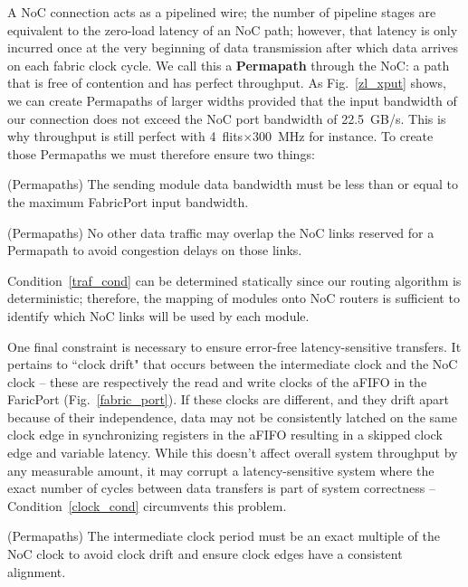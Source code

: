 A NoC connection acts as a pipelined wire; the number of pipeline stages are equivalent to the zero-load latency of an NoC path; however, that latency is only incurred once at the very beginning of data transmission after which data arrives on each fabric clock cycle.
We call this a \textbf{Permapath} through the NoC: a path that is free of contention and has perfect throughput.
As Fig.~\ref{zl_xput} shows, we can create Permapaths of larger widths provided that the input bandwidth of our connection does not exceed the NoC port bandwidth of 22.5~GB/s.
This is why throughput is still perfect with 4~flits$\times$300~MHz for instance.
To create those Permapaths we must therefore ensure two things:
%
\begin{cond}
(Permapaths)
The sending module data bandwidth must be less than or equal to the maximum FabricPort input bandwidth.
\end{cond}
%
\begin{cond}
\label{traf_cond}
(Permapaths)
No other data traffic may overlap the NoC links reserved for a Permapath to avoid congestion delays on those links.
\end{cond}
%
Condition~\ref{traf_cond} can be determined statically since our routing algorithm is deterministic; therefore, the mapping of modules onto NoC routers is sufficient to identify which NoC links will be used by each module.

One final constraint is necessary to ensure error-free latency-sensitive transfers.
It pertains to ``clock drift" that occurs between the intermediate clock and the NoC clock -- these are respectively the read and write clocks of the aFIFO in the FaricPort (Fig.~\ref{fabric_port}).
If these clocks are different, and they drift apart because of their independence, data may not be consistently latched on the same clock edge in synchronizing registers in the aFIFO resulting in a skipped clock edge and variable latency.
While this doesn't affect overall system throughput by any measurable amount, it may corrupt a latency-sensitive system where the exact number of cycles between data transfers is part of system correctness -- Condition~\ref{clock_cond} circumvents this problem.

%
\begin{cond}
\label{clock_cond}
(Permapaths)
The intermediate clock period must be an exact multiple of the NoC clock to avoid clock drift and ensure clock edges have a consistent alignment.
\end{cond}
%

%
%
